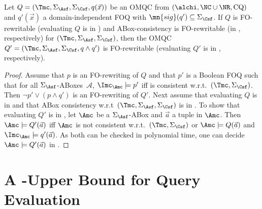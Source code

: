 \documentclass{lmcs}
\theoremstyle{definition}
\begin{document}
\begin{thm}
\label{thm:FOQs}
Let $Q=(\Tmc,\Sigma_{\Asf},\Sigma_{\Csf},q(\vec{x}))$ be an OMQC from
$(\alchi,\NC \cup \NR,\text{CQ})$ and $q'(\vec{x})$ a
domain-independent FOQ with $\mn{sig}(q') \subseteq \Sigma_\Csf$.
If $Q$ is FO-rewritable (evaluating $Q$ is in \ptime) and
ABox-consistency is FO-rewritable (in \ptime, respectively) for
$(\Tmc,\Sigma_{\Asf},\Sigma_{\Csf})$, then 
the OMQC $Q'=(\Tmc,\Sigma_{\Asf},\Sigma_{\Csf},q \wedge q')$ is FO-rewritable
(evaluating $Q'$ is in \ptime, respectively).
\end{thm}
\begin{proof}
  Assume that $p$ is an FO-rewriting of $Q$ and that $p'$ is a Boolean
  FOQ such that for all $\Sigma_{\Asf}$-ABoxes~$\mathcal{A}$,
  $\Imc_{\Amc} \models p'$ iff \Amc is consistent w.r.t.\
  $(\Tmc,\Sigma_\Csf)$. Then $\neg p' \vee (p \wedge q')$ is an
  FO-rewriting of $Q'$.  Next assume that evaluating $Q$ is in \PTime
  and that ABox consistency w.r.t~$(\Tmc,\Sigma_{\Asf},\Sigma_{\Csf})$
  is in \ptime.  To show that evaluating $Q'$ is in \ptime, let $\Amc$
  be a $\Sigma_{\Asf}$-ABox and $\vec{a}$ a tuple in $\Amc$. Then
  $\Amc\models Q'(\vec{a})$ iff $\Amc$ is not consistent
  w.r.t.~$(\Tmc,\Sigma_{\Csf})$ or $\Amc\models Q(\vec{a})$ and
  $\Imc_{\Amc}\models q'(\vec{a})$. As both can be checked in
  polynomial time, one can decide $\Amc\models Q'(\vec{a})$ in \ptime.
\end{proof}
%  
%

\section{A \conp-Upper Bound for Query Evaluation}
\label{sect:basicres}
\end{document}

